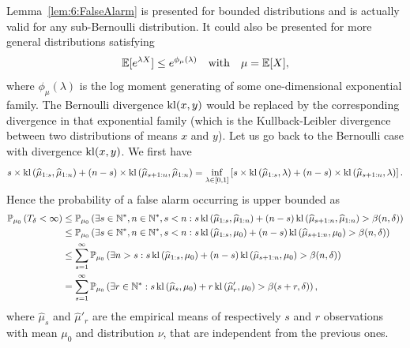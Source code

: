 \begin{smallproof}
Lemma~\ref{lem:6:FalseAlarm} is presented for bounded distributions and is actually valid for any sub-Bernoulli distribution. It could also be presented for more general distributions satisfying
\begin{equation}
    \mathbb{E}[e^{\lambda X} ] \leq e^{\phi_\mu(\lambda)} \ \ \text{ with } \ \ \mu=\mathbb{E}[X]\label{def:6:subExpo},
\end{equation}
where $\phi_\mu(\lambda)$ is the $\mathrm{log}$ moment generating of some one-dimensional exponential family. The Bernoulli divergence $\mathrm{kl}(x,y)$ would be replaced by the corresponding divergence in that exponential family (which is the Kullback-Leibler divergence between two distributions of means $x$ and $y$).
%
Let us go back to the Bernoulli case with divergence $\mathrm{kl}(x,y)$.
We first have
\[s \times \mathrm{kl}\left(\widehat{\mu}_{1:s},\widehat{\mu}_{1:n}\right) + (n-s) \times \mathrm{kl}\left(\widehat{\mu}_{s+1:n},\widehat{\mu}_{1:n}\right) = \inf_{\lambda \in [0,1]}\left[s \times \mathrm{kl}\left(\widehat{\mu}_{1:s},\lambda\right) + (n-s) \times \mathrm{kl}\left(\widehat{\mu}_{s+1:n},\lambda\right)\right].\]
Hence the probability of a false alarm occurring is upper bounded as
%
\begin{align*}
    \mathbb{P}_{\mu_0}\left(T_{\delta} < \infty\right) & \leq \mathbb{P}_{\mu_0}\left(\exists s \in \mathbb{N}^*, n \in \mathbb{N}^*, s < n:  s \, \mathrm{kl}\left(\widehat{\mu}_{1:s},\widehat{\mu}_{1:n}\right) + (n-s) \, \mathrm{kl}\left(\widehat{\mu}_{s+1:n},\widehat{\mu}_{1:n}\right) > \beta(n,\delta)\right)\\
    & \leq \mathbb{P}_{\mu_0}\left(\exists s \in \mathbb{N}^*, n \in \mathbb{N}^*, s < n:  s \, \mathrm{kl}\left(\widehat{\mu}_{1:s},\mu_0\right) + (n-s) \, \mathrm{kl}\left(\widehat{\mu}_{s+1:n},\mu_0\right) > \beta(n,\delta)\right) \\
    & \leq \sum_{s =1}^{\infty} \mathbb{P}_{\mu_0}\left(\exists n > s:  s \, \mathrm{kl}\left(\widehat{\mu}_{1:s},\mu_0\right) + (n-s) \, \mathrm{kl}\left(\widehat{\mu}_{s+1:n},\mu_0\right) > \beta(n,\delta)\right)\\
    & =   \sum_{s =1}^{\infty} \mathbb{P}_{\mu_0}\left(\exists r \in \mathbb{N}^*:  s \, \mathrm{kl}\left(\widehat{\mu}_{s},\mu_0\right) + r \, \mathrm{kl}\left(\widehat{\mu}'_{r},\mu_0\right) > \beta(s+r,\delta)\right),
\end{align*}
%
where $\widehat{\mu}_{s}$ and $\widehat{\mu}'_{r}$ are the empirical means of respectively $s$ and $r$ \iid{} observations with mean $\mu_0$ and distribution $\nu$, that are independent from the previous ones.

\end{smallproof}
